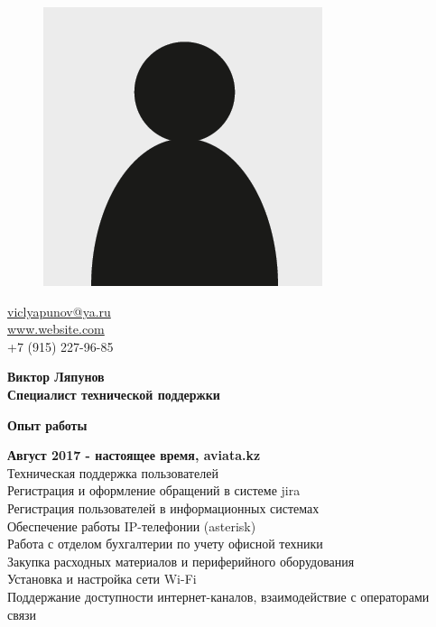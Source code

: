 \documentclass[a4paper,12pt,final]{memoir}
\newcommand{\SmallSep}{\vspace{0.5em}}
\newcommand{\CVSection}[1]
	{\Large\textbf{#1}\par
	\SmallSep\normalsize\normalfont}
\newcommand{\CVItem}[1]
	{\textbf{\color{RoyalBlue} #1}}
\begin{document}
%
\begin{figure}
	\hfill
	\includegraphics[width=0.6\columnwidth]{cv-photo.png}
	\vspace{-7cm}
\end{figure}

\begin{flushright}\small
	\url{viclyapunov@ya.ru}  \\
	\url{www.website.com} \\
	+7 (915) 227-96-85
\end{flushright}\normalsize
\framebreak


\Huge\bfseries {\color{RoyalBlue} Виктор Ляпунов} \\
\Large\bfseries  Специалист технической поддержки \\

\normalsize\normalfont


\CVSection{Опыт работы}
\CVItem{Август 2017 -  настоящее время, aviata.kz}\\
Техническая поддержка пользователей\\
Регистрация и оформление обращений в системе jira\\
Регистрация пользователей в информационных системах\\
Обеспечение работы IP-телефонии (asterisk)\\
Работа с отделом бухгалтерии по учету офисной техники\\
Закупка расходных материалов и периферийного оборудования\\
Установка и настройка сети Wi-Fi\\
Поддержание доступности интернет-каналов, взаимодействие с операторами связи
\SmallSep
\end{document}
